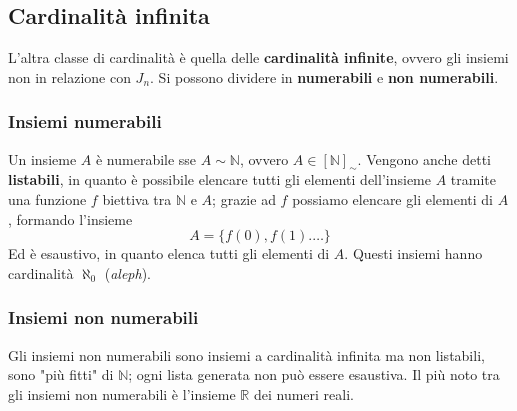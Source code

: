 \subsection{Cardinalità infinita}
L'altra classe di cardinalità è quella delle \textbf{cardinalità infinite}, ovvero gli insiemi non in relazione con $J_n$. Si possono dividere in \textbf{numerabili} e \textbf{non numerabili}.

\subsubsection{Insiemi numerabili}
Un insieme $A$ è numerabile sse $A \sim \mathbb{N}$, ovvero $A \in [\mathbb{N}]_\sim$. Vengono anche detti \textbf{listabili}, in quanto è possibile elencare tutti gli elementi dell'insieme $A$ tramite una funzione $f$ biettiva tra $\mathbb{N}$ e $A$; grazie ad $f$ possiamo elencare gli elementi di $A$, formando l'insieme 
$$ A = \{f(0), f(1). \dots \} $$
Ed è esaustivo, in quanto elenca tutti gli elementi di $A$. Questi insiemi hanno cardinalità $\aleph_0$ (\textit{aleph}).

\subsubsection{Insiemi non numerabili}
Gli insiemi non numerabili sono insiemi a cardinalità infinita ma non listabili, sono "più fitti" di $\mathbb{N}$; ogni lista generata non può essere esaustiva. Il più noto tra gli insiemi non numerabili è l'insieme $\mathbb{R}$ dei numeri reali. \\

